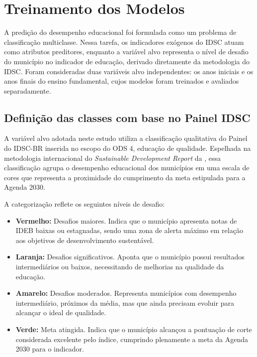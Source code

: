 \section{Treinamento dos Modelos}

A predição do desempenho educacional foi formulada como um problema de classificação multiclasse. Nessa tarefa, os indicadores exógenos do IDSC atuam como atributos preditores, enquanto a variável alvo representa o nível de desafio do município no indicador de educação, derivado diretamente da metodologia do IDSC. Foram consideradas duas variáveis alvo independentes: os anos iniciais e os anos finais do ensino fundamental, cujos modelos foram treinados e avaliados separadamente.

\subsection{Definição das classes com base no Painel IDSC}

A variável alvo adotada neste estudo utiliza a classificação qualitativa do Painel do IDSC-BR inserida no escopo do ODS 4, educação de qualidade. Espelhada na metodologia internacional do \textit{Sustainable Development Report} da , essa classificação agrupa o desempenho educacional dos municípios em uma escala de cores que representa a proximidade do cumprimento da meta estipulada para a Agenda 2030. 

A categorização reflete os seguintes níveis de desafio:
\begin{itemize}
	\item \textbf{Vermelho:} Desafios maiores. Indica que o município apresenta notas de IDEB baixas ou estagnadas, sendo uma zona de alerta máximo em relação aos objetivos de desenvolvimento sustentável.
	\item \textbf{Laranja:} Desafios significativos. Aponta que o município possui resultados intermediários ou baixos, necessitando de melhorias na qualidade da educação.
	\item \textbf{Amarelo:} Desafios moderados. Representa municípios com desempenho intermediário, próximos da média, mas que ainda precisam evoluir para alcançar o ideal de qualidade.
	\item \textbf{Verde:} Meta atingida. Indica que o município alcançou a pontuação de corte considerada excelente pelo índice, cumprindo plenamente a meta da Agenda 2030 para o indicador.
\end{itemize}

